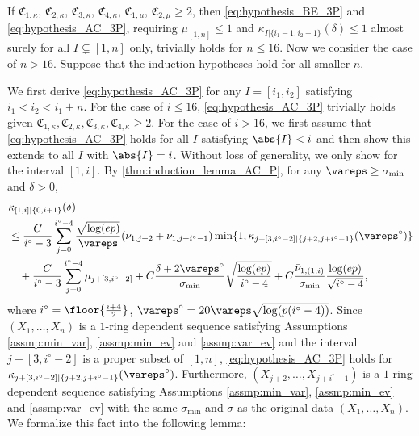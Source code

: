 \documentclass[aos]{imsart}
\begin{document}
\begin{appendix}
If $\mathfrak{C}_{1,\kappa}$, $\mathfrak{C}_{2,\kappa}$, $\mathfrak{C}_{3,\kappa}$, $\mathfrak{C}_{4,\kappa}$, $\mathfrak{C}_{1,\mu}$, $\mathfrak{C}_{2,\mu} \geq 2$, then \eqref{eq:hypothesis_BE_3P} and \eqref{eq:hypothesis_AC_3P}, requiring $\mu_{[1,n]} \leq 1$ and $\kappa_{I|\{i_1-1,i_2+1\}}(\delta) \leq 1$ almost surely for all $I \subsetneq [1,n]$ only, trivially holds for $n \leq 16$. Now we consider the case of $n > 16$. Suppose that the induction hypotheses hold for all smaller $n$. 

We first derive \eqref{eq:hypothesis_AC_3P} for any $I = [i_1, i_2]$ satisfying $i_1 < i_2 < i_1+n$. For the case of $i \leq 16$, \eqref{eq:hypothesis_AC_3P} trivially holds given $\mathfrak{C}_{1,\kappa}, \mathfrak{C}_{2,\kappa}, \mathfrak{C}_{3,\kappa}, \mathfrak{C}_{4,\kappa} \geq 2$. For the case of $i > 16$, we first assume that \eqref{eq:hypothesis_AC_3P} holds for all $I$ satisfying $\abs{I} < i$ and then show this extends to all $I$ with $\abs{I} = i$. Without loss of generality, we only show for the interval $[1,i]$.
By \cref{thm:induction_lemma_AC_P}, 
for any $\vareps \geq \sigma_{\min}$ and $\delta > 0$,
\begin{equation*} %
\begin{aligned}
    & \kappa_{[1,i]|\{0, i+1\}}(\delta) \\
    & \leq \frac{C}{i^\circ-3} \sum_{j=0}^{i^\circ-4}  
    \frac{\sqrt{\log(ep)}}{\vareps} (\nu_{1,j+2} + \nu_{1,j+i^\circ-1}) 
    \min\{1, \kappa_{j+[3,i^\circ-2]|\{j+2, j+i^\circ-1\}}(\vareps^\circ)\} \\
    & \quad + \frac{C}{i^\circ-3} \sum_{j=0}^{i^\circ-4} \mu_{j+[3,i^\circ-2]}
    + C\frac{\delta + 2\vareps^\circ}{\sigma_{\min}} \sqrt{\frac{\log(ep)}{i^\circ-4}}
    + C\frac{\bar\nu_{1,(1,i)}}{\sigma_{\min}} \frac{\log(ep)}{\sqrt{i^\circ-4}},
\end{aligned}
\end{equation*}
where $i^\circ = \floor{\frac{i+4}{2}}$, $\vareps^\circ = 20\vareps \sqrt{\log(p(i^\circ-4))}$. 
Since $(X_1, \dots, X_n)$ is a $1$-ring dependent sequence satisfying Assumptions \eqref{assmp:min_var}, \eqref{assmp:min_ev} and \eqref{assmp:var_ev} and the interval $j+[3,i^\circ-2]$ is a proper subset of $[1,n]$, \eqref{eq:hypothesis_AC_3P} holds for $\kappa_{j+[3,i^\circ-2]|\{j+2, j+i^\circ-1\}}(\vareps^\circ)$. Furthermore, $(X_{j+2}, \dots, X_{j+i^\circ-1})$ is a $1$-ring dependent sequence satisfying Assumptions \eqref{assmp:min_var}, \eqref{assmp:min_ev} and \eqref{assmp:var_ev} with the same $\sigma_{\min}$ and $\underline{\sigma}$ as the original data $(X_1, \dots, X_n)$. We formalize this fact into the following lemma:

\end{appendix}
\end{document}
